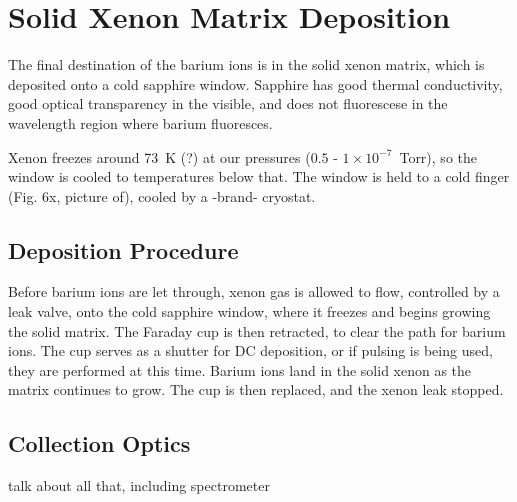 \section{Solid Xenon Matrix Deposition}

The final destination of the barium ions is in the solid xenon matrix, which is deposited onto a cold sapphire window.  Sapphire has good thermal conductivity, good optical transparency in the visible, and does not fluorescese in the wavelength region where barium fluoresces.  

Xenon freezes around 73~K (?) at our pressures ($0.5$ - $1 \times 10^{-7}$~Torr), so the window is cooled to temperatures below that.  The window is held to a cold finger (Fig. 6x, picture of), cooled by a -brand- cryostat. %

\subsection{Deposition Procedure}

Before barium ions are let through, xenon gas is allowed to flow, controlled by a leak valve, onto the cold sapphire window, where it freezes and begins growing the solid matrix.  The Faraday cup is then retracted, to clear the path for barium ions.  The cup serves as a shutter for DC deposition, or if pulsing is being used, they are performed at this time.  Barium ions land in the solid xenon as the matrix continues to grow.  The cup is then replaced, and the xenon leak stopped.

\subsection{Collection Optics}

talk about all that, including spectrometer